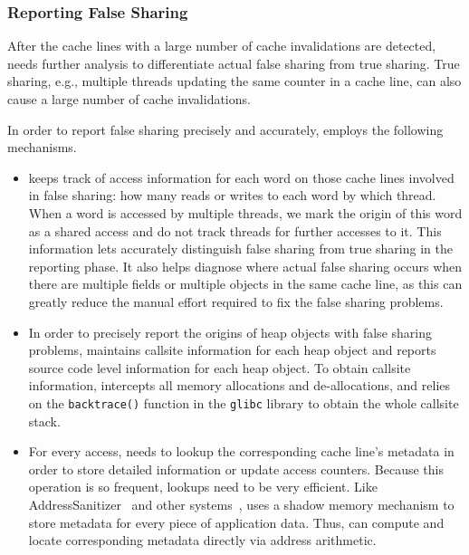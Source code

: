 \subsubsection{Reporting False Sharing}

After the cache lines with a large number of cache invalidations are detected,
\Predator{} needs further analysis to differentiate actual false sharing from true sharing. 
True sharing, e.g., multiple threads updating the same counter in a cache line, can also cause a large number of cache invalidations.

In order to report false sharing precisely and accurately,  
\Predator{} employs the following mechanisms. 

\begin{itemize}
\item

\Predator{} keeps track of access information for each word on those cache lines involved in false sharing: how many reads or writes to each word by which thread.  When a word is accessed by multiple threads, we mark the origin of this word as a shared access and do not track threads for further accesses to it. This information lets \Predator{} accurately distinguish false sharing from true sharing in the reporting phase.  It also helps diagnose where
actual false sharing occurs when there are multiple fields or multiple
objects in the same cache line, as this can greatly reduce the manual
effort required to fix the false sharing problems.

\item
In order to precisely report the origins of heap objects with false
sharing problems, \Predator{} maintains callsite information for each heap
object and reports source code level information for each heap
object. To obtain callsite information, \Predator{} intercepts all memory allocations and de-allocations, and relies
on the \texttt{backtrace()} function in the \texttt{glibc} library to obtain the whole callsite stack.

\item
For every access, \Predator{} needs to lookup the corresponding cache line's metadata 
in order to store detailed information or update access counters. Because this operation is so frequent,
 lookups need to be very efficient.
Like 
AddressSanitizer~\cite{Addresssanitizer} and other systems~\cite{qinzhaodetection,Valgrind},
\Predator{} uses a shadow memory mechanism to store metadata for every piece of application data. 
Thus, \Predator{} can compute and locate corresponding metadata directly via address arithmetic.


\end{itemize}
